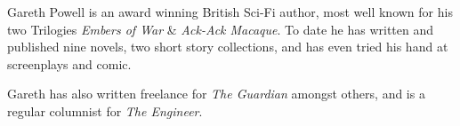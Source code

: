 Gareth Powell is an award winning British Sci-Fi author, most well known for his two Trilogies \emph{Embers of War} \& \emph{Ack-Ack Macaque}. To date he has written and published nine novels, two short story collections, and has even tried his hand at screenplays and comic.

Gareth has also written freelance for \emph{The Guardian} amongst others, and is a regular columnist for \emph{The Engineer}.